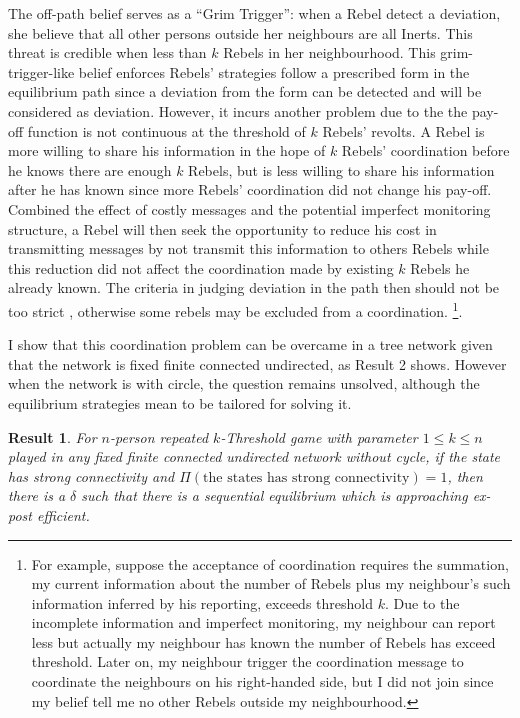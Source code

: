\documentclass[12pt,letter]{article}
\newtheorem{result}{Result}
\theoremstyle{remark}
\theoremstyle{remark}
\theoremstyle{claim}
\begin{document}
The off-path belief serves as a ``Grim Trigger'': when a Rebel detect a deviation, she believe that all other persons outside her neighbours are all Inerts. This threat is credible when less than $k$ Rebels in her neighbourhood. This grim-trigger-like belief enforces Rebels' strategies follow a prescribed form in the equilibrium path since a deviation from the form can be detected and will be considered as deviation. However, it incurs another problem due to the the pay-off function is not continuous at the threshold of $k$ Rebels' revolts. A Rebel is more willing to share his information in the hope of $k$ Rebels' coordination before he knows there are enough $k$ Rebels, but is less willing to share his information after he has known since more Rebels' coordination did not change his pay-off.  Combined the effect of costly messages and the potential imperfect monitoring structure, a Rebel will then seek the opportunity to reduce his cost in transmitting messages by not transmit this information to others Rebels while this reduction did not affect the coordination made by existing $k$ Rebels he already known. The criteria in judging deviation in the path then should not be too strict , otherwise some rebels may be excluded from a coordination. \footnote{For example, suppose the acceptance of coordination requires the summation, my current information about the number of Rebels plus my neighbour's such information inferred by his reporting, exceeds threshold $k$. Due to the incomplete information and imperfect monitoring, my neighbour can report less but actually my neighbour has known the number of Rebels has exceed threshold. Later on, my neighbour trigger the coordination message to coordinate the neighbours on his right-handed side, but I did not join since my belief tell me no other Rebels outside my neighbourhood.}. 

I show that this coordination problem can be overcame in a tree network given that the network is fixed finite connected undirected, as Result 2 shows. However when the network is with circle, the question remains unsolved, although the equilibrium strategies mean to be tailored for solving it.  

\begin{result}
For $n$-person repeated $k$-Threshold game with parameter $1\leq k \leq n$ played in any fixed finite connected undirected network without cycle,
if the state has strong connectivity and $\Pi(\text{the states has strong connectivity})=1$, then there is a $\delta$ such that there is a sequential equilibrium which is approaching ex-post efficient.
\end{result}
\end{document}
